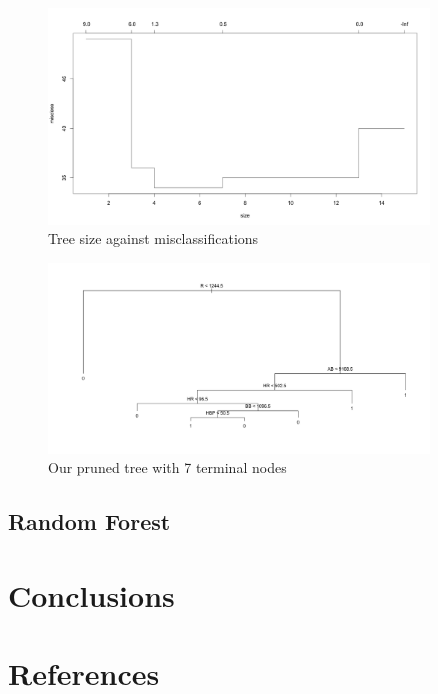 \documentclass[preprint,12pt]{elsarticle}
\begin{document}
\begin{figure}[h2]
	\centering
	\includegraphics[width=0.9\textwidth]{pruneCV}
	\caption{Tree size against misclassifications}
\end{figure}

\begin{figure}[h3]
	\centering
	\includegraphics[width=0.9\textwidth]{pruned}
	\caption{Our pruned tree with 7 terminal nodes}
\end{figure}


\subsection{Random Forest}

\section{Conclusions}



\section{References}


\end{document}
